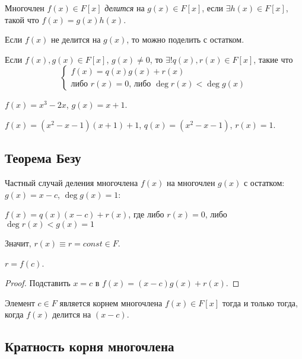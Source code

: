 \begin{definition}
    Многочлен $f(x) \in F[x]$ \textit{делится} на $g(x) \in F[x]$, если $\exists h(x) \in F[x]$, такой что $f(x) = g(x) h(x)$.
\end{definition}

Если $f(x)$ не делится на $g(x)$, то можно поделить с остатком.

\begin{proposal}
    Если $f(x), g(x) \in F[x]$, $g(x) \neq 0$, то $\exists! q(x), r(x) \in F[x]$, такие что
    \begin{equation*}
        \begin{cases}
            f(x) = q(x) g(x) + r(x) \\
            \text{либо } r(x) = 0 \text{, либо } \deg r(x) < \deg g(x)
        \end{cases}
    \end{equation*}
\end{proposal}

\begin{example}
    $f(x) = x^3 - 2x$, $g(x) = x + 1$.

    $f(x) = (x^2 - x - 1)(x + 1) + 1$, $q(x) = (x^2 - x - 1)$, $r(x) = 1$.
\end{example}


\subsection{Теорема Безу}

Частный случай деления многочлена $f(x)$ на многочлен $g(x)$ с остатком: $g(x) = x - c$, $\deg g(x) = 1$:

$f(x) = q(x) (x - c) + r(x)$, где либо $r(x) = 0$, либо $\deg r(x) < g(x) = 1$

Значит, $r(x) \equiv r = const \in F$.

\begin{theorem}
    $r = f(c)$.
\end{theorem}

\begin{proof}
    Подставить $x = c$ в $f(x) = (x - c)g(x) + r(x)$.
\end{proof}

\begin{corollary}
    Элемент $c \in F$ является корнем многочлена $f(x) \in F[x]$ тогда и только тогда, когда $f(x)$ делится на $(x - c)$.
\end{corollary}


\subsection{Кратность корня многочлена}

